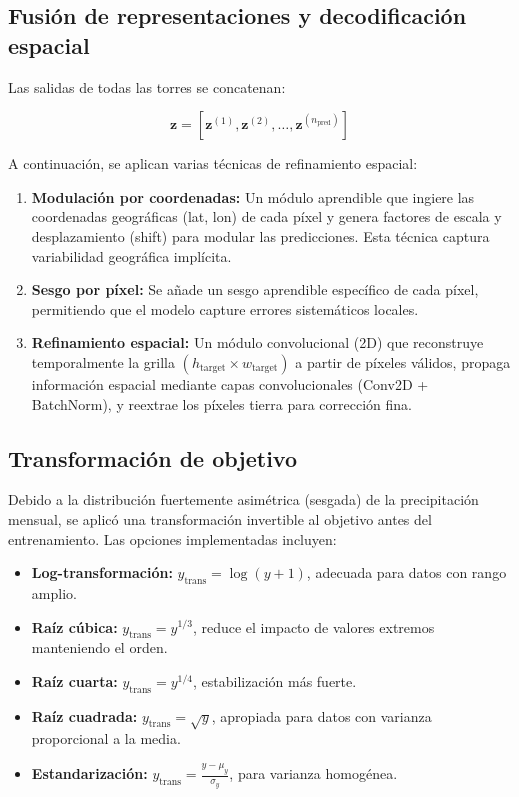 \subsection{Fusión de representaciones y decodificación espacial}
Las salidas de todas las torres se concatenan:

\begin{equation}
    \mathbf{z} = [\mathbf{z}^{(1)}, \mathbf{z}^{(2)}, \ldots, \mathbf{z}^{(n_{\text{pred}})}]
\end{equation}

A continuación, se aplican varias técnicas de refinamiento espacial:

\begin{enumerate}
    \item \textbf{Modulación por coordenadas:} Un módulo aprendible que ingiere las coordenadas geográficas (lat, lon) de cada píxel y genera factores de escala y desplazamiento (shift) para modular las predicciones. Esta técnica captura variabilidad geográfica implícita.
    
    \item \textbf{Sesgo por píxel:} Se añade un sesgo aprendible específico de cada píxel, permitiendo que el modelo capture errores sistemáticos locales.
    
    \item \textbf{Refinamiento espacial:} Un módulo convolucional (2D) que reconstruye temporalmente la grilla $(h_{\text{target}} \times w_{\text{target}})$ a partir de píxeles válidos, propaga información espacial mediante capas convolucionales (Conv2D + BatchNorm), y reextrae los píxeles tierra para corrección fina.
\end{enumerate}

\subsection{Transformación de objetivo}
Debido a la distribución fuertemente asimétrica (sesgada) de la precipitación mensual, se aplicó una transformación invertible al objetivo antes del entrenamiento. Las opciones implementadas incluyen:

\begin{itemize}
    \item \textbf{Log-transformación:} $y_{\text{trans}} = \log(y + 1)$, adecuada para datos con rango amplio.
    \item \textbf{Raíz cúbica:} $y_{\text{trans}} = y^{1/3}$, reduce el impacto de valores extremos manteniendo el orden.
    \item \textbf{Raíz cuarta:} $y_{\text{trans}} = y^{1/4}$, estabilización más fuerte.
    \item \textbf{Raíz cuadrada:} $y_{\text{trans}} = \sqrt{y}$, apropiada para datos con varianza proporcional a la media.
    \item \textbf{Estandarización:} $y_{\text{trans}} = \frac{y - \mu_y}{\sigma_y}$, para varianza homogénea.
\end{itemize}


